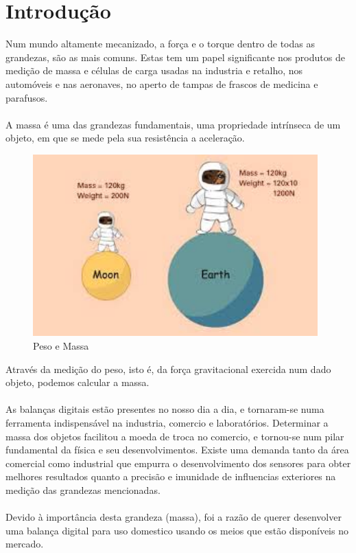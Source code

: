 \chapter{Introdução}
Num mundo altamente mecanizado, a força e o torque dentro de todas as grandezas, são as mais comuns. Estas tem um papel significante nos produtos de medição de massa e células de carga usadas na industria e retalho, nos automóveis e nas aeronaves, no aperto de tampas de frascos de medicina e parafusos.\cite{book-9}\\
\\
A massa é uma das grandezas fundamentais, uma propriedade intrínseca de um objeto, em que se mede pela sua resistência a aceleração.\cite{book-2}
\begin{figure}[H]
	\centering
	\includegraphics[height=7cm]{./image/PESTA/fisica/mass.jpg}
	\caption{Peso e Massa}
	\label{mass}
\end{figure}
Através da medição do peso, isto é, da força gravitacional exercida num dado objeto, podemos calcular a massa. \cite{book-2}\\
\\
As balanças digitais estão presentes no nosso dia a dia, e tornaram-se numa ferramenta indispensável na industria, comercio e laboratórios. Determinar a massa dos objetos facilitou a moeda de troca no comercio, e tornou-se num pilar fundamental da física e seu desenvolvimentos. Existe uma demanda tanto da área comercial como industrial que empurra o desenvolvimento dos sensores para obter melhores resultados quanto a precisão e imunidade de influencias exteriores na medição das grandezas mencionadas.\\
\\
Devido à importância desta grandeza (massa), foi a razão de querer desenvolver uma balança digital para uso domestico usando os meios que estão disponíveis no mercado.
\newpage

